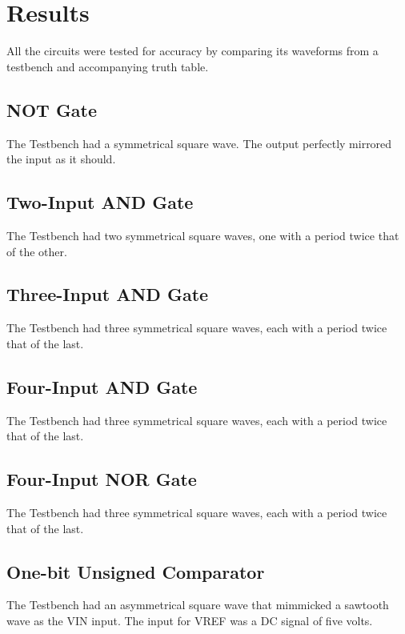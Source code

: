\documentclass[conference]{IEEEtran}
\begin{document}
\section{Results}

All the circuits were tested for accuracy by comparing its waveforms from a testbench and accompanying truth table.

\subsection{NOT Gate}

The Testbench had a symmetrical square wave. The output perfectly mirrored the input as it should.

\subsection{Two-Input AND Gate}

The Testbench had two symmetrical square waves, one with a period twice that of the other.

\subsection{Three-Input AND Gate}

The Testbench had three symmetrical square waves, each with a period twice that of the last.

\subsection{Four-Input AND Gate}

The Testbench had three symmetrical square waves, each with a period twice that of the last.

\subsection{Four-Input NOR Gate}

The Testbench had three symmetrical square waves, each with a period twice that of the last.

\subsection{One-bit Unsigned Comparator}

The Testbench had an asymmetrical square wave that mimmicked a sawtooth wave as the VIN input. The input for VREF was a DC signal of five volts.
\end{document}
